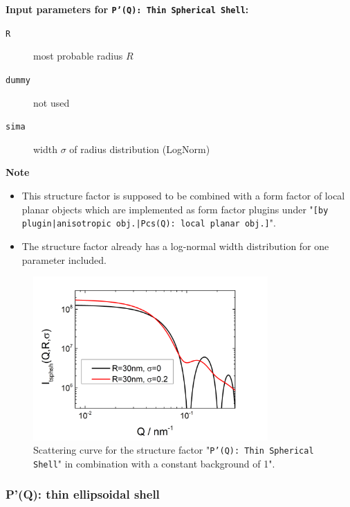 \noindent
\textbf{Input parameters for \texttt{P'(Q): Thin Spherical Shell}:}
\begin{description}
    \item[\texttt{R}] most probable radius $R$
    \item[\texttt{dummy}] not used
    \item[\texttt{sima}] width $\sigma$ of radius distribution (LogNorm)
\end{description}

\noindent
\textbf{Note}
\begin{itemize}
  \item This structure factor is supposed to be combined with a form factor of local planar objects which are implemented as form factor plugins
under "\texttt{[by plugin|anisotropic obj.|Pcs(Q): local planar obj.]}".
\item The structure factor already has a log-normal width distribution for one parameter included.
\end{itemize}

\begin{figure}[htb]
\begin{center}
\includegraphics[width=0.8\textwidth,height=0.55\textwidth]{../images/form_factor/anisotropic/PprimeThinSphShell.png}
\end{center}
\caption{Scattering curve for the structure factor "\texttt{P'(Q): Thin Spherical Shell}" in combination with a constant background of 1".}
\label{fig_IQ:PprimeThinSphShell}
\end{figure}


\clearpage
\subsubsection{P'(Q): thin ellipsoidal shell} ~\\
\label{plugin:Pprime4ellShell}

